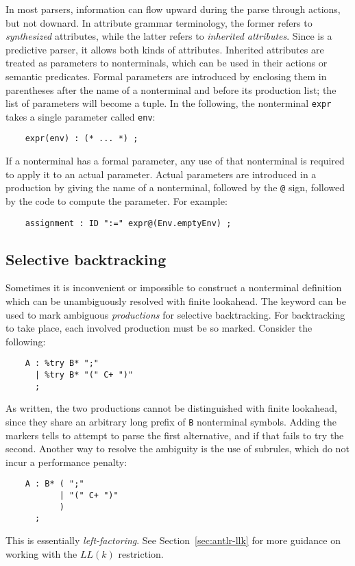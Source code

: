 In most parsers, information can flow upward during the parse through actions, but not downard.  In attribute grammar terminology, the former refers to \emph{synthesized} attributes, while the latter refers to \emph{inherited attributes}.  Since \antlr{} is a predictive parser, it allows both kinds of attributes.  Inherited attributes are treated as parameters to nonterminals, which can be used in their actions or semantic predicates.  Formal parameters are introduced by enclosing them in parentheses after the name of a nonterminal and before its production list; the list of parameters will become a tuple.  In the following, the nonterminal {\tt expr} takes a single parameter called {\tt env}:
\begin{verbatim}
    expr(env) : (* ... *) ;
\end{verbatim}
If a nonterminal has a formal parameter, any use of that nonterminal is required to apply it to an actual parameter.  Actual parameters are introduced in a production by giving the name of a nonterminal, followed by the {\tt @} sign, followed by the code to compute the parameter.  For example:
\begin{verbatim}
    assignment : ID ":=" expr@(Env.emptyEnv) ;
\end{verbatim}

\subsection{Selective backtracking}

Sometimes it is inconvenient or impossible to construct a nonterminal definition which can be unambiguously resolved with finite lookahead.%
  The  keyword can be used to mark ambiguous \emph{productions} for selective backtracking.  For backtracking to take place, each involved production must be so marked.  Consider the following:
\begin{verbatim}
    A : %try B* ";"
      | %try B* "(" C+ ")"
      ;
\end{verbatim}
As written, the two productions cannot be distinguished with finite lookahead, since they share an arbitrary long prefix of {\tt B} nonterminal symbols.  Adding the  markers tells \antlr{} to attempt to parse the first alternative, and if that fails to try the second.  Another way to resolve the ambiguity is the use of subrules, which do not incur a performance penalty:
\begin{verbatim}
    A : B* ( ";"
           | "(" C+ ")"
           )
      ;
\end{verbatim}
This is essentially \emph{left-factoring}. See Section~\ref{sec:antlr-llk} for more guidance on working with the $LL(k)$ restriction.

